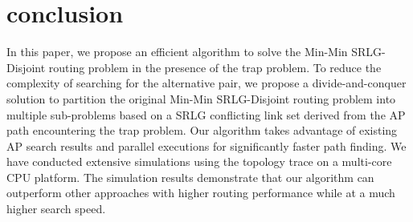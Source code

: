 \section{conclusion}
\label{sec:conclusion}
In this paper, we propose an efficient algorithm to solve the Min-Min  SRLG-Disjoint routing problem in the presence of the trap problem. To reduce the complexity of searching for the alternative pair, we propose a divide-and-conquer solution to partition the original Min-Min SRLG-Disjoint routing problem into multiple sub-problems based on a SRLG conflicting link set derived from the AP path encountering the trap problem. Our algorithm takes advantage of existing AP search results and parallel executions for significantly faster path finding.
We have conducted extensive simulations  using the topology trace  on a multi-core CPU platform. The simulation results demonstrate that our algorithm can outperform other approaches with higher routing performance while at a much higher search speed.
